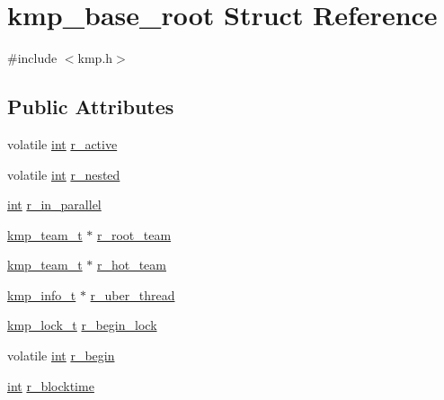 \hypertarget{structkmp__base__root}{\section{kmp\-\_\-base\-\_\-root Struct Reference}
\label{structkmp__base__root}
}


{\ttfamily \#include $<$kmp.\-h$>$}

\subsection*{Public Attributes}
\begin{DoxyCompactItemize}
\item 
volatile \hyperlink{ittnotify__static_8h_a8b8dcd723308a8cb5d84277c7a3fff70}{int} \hyperlink{structkmp__base__root_a5e06d11eeaab64b07044ed113e702f88}{r\-\_\-active}
\item 
volatile \hyperlink{ittnotify__static_8h_a8b8dcd723308a8cb5d84277c7a3fff70}{int} \hyperlink{structkmp__base__root_ab4917588eeaf55157ecf8296c364d016}{r\-\_\-nested}
\item 
\hyperlink{ittnotify__static_8h_a8b8dcd723308a8cb5d84277c7a3fff70}{int} \hyperlink{structkmp__base__root_ac92ed0f51c2cde642c6f08776593d157}{r\-\_\-in\-\_\-parallel}
\item 
\hyperlink{kmp_8h_a95f7a64bda9b774add6c27c4a7b2a143}{kmp\-\_\-team\-\_\-t} $\ast$ \hyperlink{structkmp__base__root_a908942350716cff98181b1eed8c19d9c}{r\-\_\-root\-\_\-team}
\item 
\hyperlink{kmp_8h_a95f7a64bda9b774add6c27c4a7b2a143}{kmp\-\_\-team\-\_\-t} $\ast$ \hyperlink{structkmp__base__root_a1d20484cd0e671de0c461c437a2f0d5c}{r\-\_\-hot\-\_\-team}
\item 
\hyperlink{kmp_8h_a194859801fe16b326efe34501a37c30a}{kmp\-\_\-info\-\_\-t} $\ast$ \hyperlink{structkmp__base__root_a8cfa85b2b03f0b7319a8dae9e2e31032}{r\-\_\-uber\-\_\-thread}
\item 
\hyperlink{kmp__lock_8h_ad1928c8c2d45f7848000a372ec4fde54}{kmp\-\_\-lock\-\_\-t} \hyperlink{structkmp__base__root_ae225c346e2a58c1b7bdc13edc16885fc}{r\-\_\-begin\-\_\-lock}
\item 
volatile \hyperlink{ittnotify__static_8h_a8b8dcd723308a8cb5d84277c7a3fff70}{int} \hyperlink{structkmp__base__root_a5e3fa49193a2933672eb8cab130766ab}{r\-\_\-begin}
\item 
\hyperlink{ittnotify__static_8h_a8b8dcd723308a8cb5d84277c7a3fff70}{int} \hyperlink{structkmp__base__root_a93210c748ab8706cb885b5480642900c}{r\-\_\-blocktime}
\end{DoxyCompactItemize}


